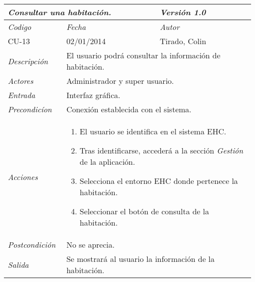 \begin{center}
    \begin{tabular}{|p{3cm}|p{4cm}|p{4cm}|p{4cm}|}
    \hline \multicolumn{3}{|p{9cm}|}{\textit{Consultar una habitaci\'on.}} & \textit{Versi\'on 1.0} \\
	\hline \textit{Codigo} & \textit{Fecha} & \multicolumn{2}{|p{6cm}|}{\textit{Autor}} \\
	CU-13 & 02/01/2014 & \multicolumn{2}{|p{6cm}|}{Tirado, Colin} \\		
    \hline \textit{Descripci\'on} & \multicolumn{3}{|p{9cm}|}{El usuario podr\'a consultar la informaci\'on de habitaci\'on.} \\
    \hline \textit{Actores} & \multicolumn{3}{|p{9cm}|}{Administrador y super usuario.} \\
    \hline \textit{Entrada} & \multicolumn{3}{|p{9cm}|}{Interfaz gr\'afica.} \\
    \hline \textit{Precondic\'ion} & \multicolumn{3}{|p{9cm}|}{Conexi\'on establecida con el sistema.} \\
    \hline \textit{Acciones} & \multicolumn{3}{|p{9cm}|}{
        \begin{enumerate}
        \item El usuario se identifica en el sistema EHC.
        \item Tras identificarse, acceder\'a a la secci\'on \textit{Gesti\'on} de la aplicaci\'on.
        \item Selecciona el entorno EHC donde pertenece la habitaci\'on.
        \item Seleccionar el bot\'on de consulta de la habitaci\'on.
        \end{enumerate}
           } \\
    \hline \textit{Postcondici\'on} & \multicolumn{3}{|p{9cm}|}{No se aprecia.} \\
    \hline \textit{Salida} & \multicolumn{3}{|p{9cm}|}{Se mostrar\'a al usuario la informaci\'on de la habitaci\'on.} \\ \hline
    \end{tabular}
\end{center}